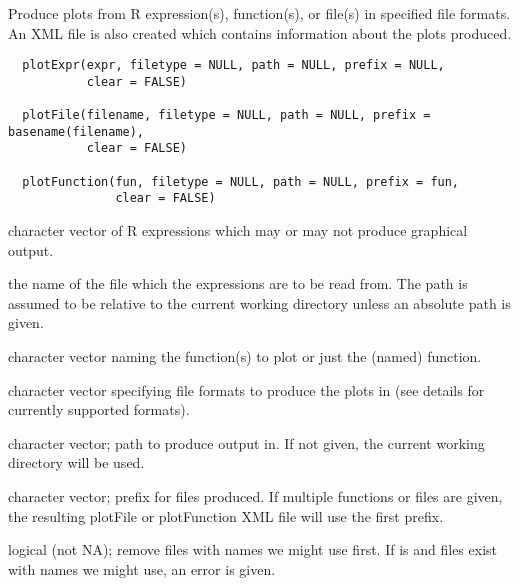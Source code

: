 \documentclass[a4paper,oneside]{book}
\begin{document}
\begin{Description}\relax
Produce plots from R expression(s), function(s), or file(s) in
specified file formats. An XML file is also created which contains
information about the plots produced.
\end{Description}
\begin{Usage}
\begin{verbatim}
  plotExpr(expr, filetype = NULL, path = NULL, prefix = NULL,
           clear = FALSE)

  plotFile(filename, filetype = NULL, path = NULL, prefix = basename(filename),
           clear = FALSE)

  plotFunction(fun, filetype = NULL, path = NULL, prefix = fun,
               clear = FALSE)
\end{verbatim}
\end{Usage}
\begin{Arguments}
\begin{ldescription}
\item[\code{expr}] character vector of R expressions which may or may not
produce graphical output.
\item[\code{filename}] the name of the file which the expressions are to be
read from. The path is assumed to be relative to the
current working directory unless an absolute path is given.
\item[\code{fun}] character vector naming the function(s) to plot or just the
(named) function.
\item[\code{filetype}] character vector specifying file formats to produce the
plots in (see details for currently supported formats).
\item[\code{path}] character vector; path to produce output in. If not given, the
current working directory will be used.
\item[\code{prefix}] character vector; prefix for files produced. If multiple
functions or files are given, the resulting plotFile or plotFunction
XML file will use the first prefix.
\item[\code{clear}] logical (not NA); remove files with names we might use
first. If  is  and files exist
with names we might use, an error is given.
\end{ldescription}
\end{Arguments}
\end{document}
